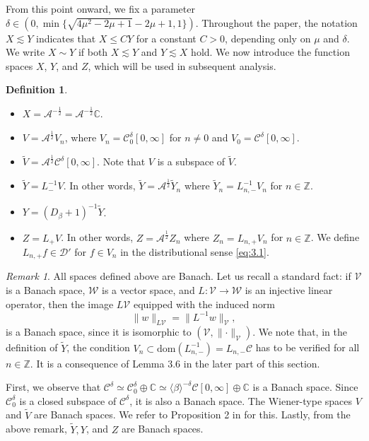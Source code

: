 \documentclass[11pt]{article}
\theoremstyle{definition}
\newtheorem{definition}[theorem]{Definition}
\theoremstyle{remark}
\newtheorem*{remark}{Remark}
\numberwithin{equation}{section}
\newcommand{\mbb}{\mathbb}
\newcommand{\mcal}{\mathcal}
\renewcommand{\tilde}{\widetilde}
\newcommand{\Z}{\mbb{Z}}
\newcommand{\C}{\mbb{C}}
\newcommand{\norm}[1]{\lVert #1 \rVert}
\begin{document}
From this point onward, we fix a parameter $\delta \in (0,\min\{\sqrt{4\mu^2 - 2\mu + 1} - 2\mu + 1, 1\})$. Throughout the paper, the notation $X \lesssim Y$ indicates that $X \leq C Y$ for a constant $C>0$, depending only on $\mu$ and $\delta$. We write $X \sim Y$ if both $X \lesssim Y$ and $Y \lesssim X$ hold. We now introduce the function spaces $X$, $Y$, and $Z$, which will be used in subsequent analysis.
\begin{definition} \label{def:3.2} \begin{itemize}
    \item $X = \mcal{A}^{-\frac{1}{2}} = \mcal{A}^{-\frac{1}{2}} \mbb{C}$.
    \item $V = \mcal{A}^{\frac{1}{2}} V_n$, where $V_n = \mcal{C}^\delta_0[0,\infty]$ for $n\neq 0$ and $V_0 = \mcal{C}^\delta[0,\infty]$.
    \item $\tilde{V} = \mcal{A}^{\frac{1}{2}} \mcal{C}^\delta[0,\infty]$. Note that $V$ is a subspace of $\tilde{V}$.
    \item $\tilde{Y} = L_-^{-1} V$. In other words, $\tilde{Y} = \mcal{A}^{\frac{1}{2}} \tilde{Y}_n$ where $\tilde{Y}_n = L_{n,-}^{-1} V_n$ for $n\in\Z$.
    \item $Y = (D_\beta + 1)^{-1} \tilde{Y}$.
    \item $Z = L_{+} V$. In other words, $Z = \mcal{A}^{\frac{1}{2}} Z_n$ where $Z_n = L_{n,+} V_n$ for $n\in \Z$. We define $L_{n,+} f \in \mcal{D}'$ for $f\in V_n$ in the distributional sense \eqref{eq:3.1}.
\end{itemize}
\end{definition}
\begin{remark} All spaces defined above are Banach. Let us recall a standard fact: if $\mcal{V}$ is a Banach space, $\mcal{W}$ is a vector space, and $L: \mcal{V} \to \mcal{W}$ is an injective linear operator, then the image $L \mcal{V}$ equipped with the induced norm
\[\norm{w}_{L\mcal{V}} = \norm{L^{-1} w}_{\mcal{V}},\]
is a Banach space, since it is isomorphic to $(\mcal{V}, \norm{\cdot}_{\mcal{V}})$. We note that, in the definition of $\tilde{Y}$, the condition $V_n \subset \text{dom}(L_{n,-}^{-1}) = L_{n,-} \mcal{C}$ has to be verified for all $n\in\Z$. It is a consequence of Lemma 3.6 in the later part of this section.

First, we observe that $\mcal{C}^\delta \simeq \mcal{C}^\delta_0 \oplus \C \simeq \langle \beta \rangle^{-\delta} \mcal{C}[0,\infty] \oplus \C$ is a Banach space. Since $\mcal{C}^\delta_0$ is a closed subspace of $\mcal{C}^\delta$, it is also a Banach space. The Wiener-type spaces $V$ and $\tilde{V}$ are Banach spaces. We refer to Proposition 2 in \cite{Ell16} for this. Lastly, from the above remark, $\tilde{Y}, Y$, and $Z$ are Banach spaces.
\end{remark}
\end{document}
